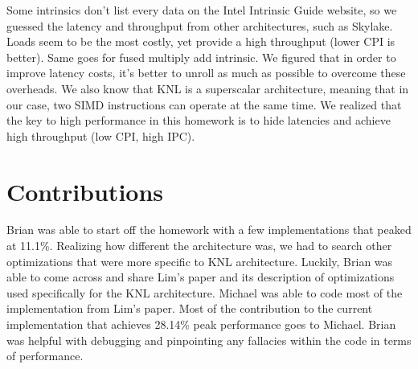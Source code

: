 \documentclass{article}
\begin{document}
Some intrinsics don't list every data on the Intel Intrinsic Guide website, so we guessed the latency and throughput from other architectures, such as Skylake. Loads seem to be the most costly, yet provide a high throughput (lower CPI is better). Same goes for fused multiply add intrinsic. We figured that in order to improve latency costs, it's better to unroll as much as possible to overcome these overheads. We also know that KNL is a superscalar architecture, meaning that in our case, two SIMD instructions can operate at the same time. We realized that the key to high performance in this homework is to hide latencies and achieve high throughput (low CPI, high IPC).

\section{Contributions}
Brian was able to start off the homework with a few implementations that peaked at 11.1\%. Realizing how different the architecture was, we had to search other optimizations that were more specific to KNL architecture. Luckily, Brian was able to come across and share Lim's paper and its description of optimizations used specifically for the KNL architecture. Michael was able to code most of the implementation from Lim's paper. Most of the contribution to the current implementation that achieves 28.14\% peak performance goes to Michael. Brian was helpful with debugging and pinpointing any fallacies within the code in terms of performance.



\end{document}
